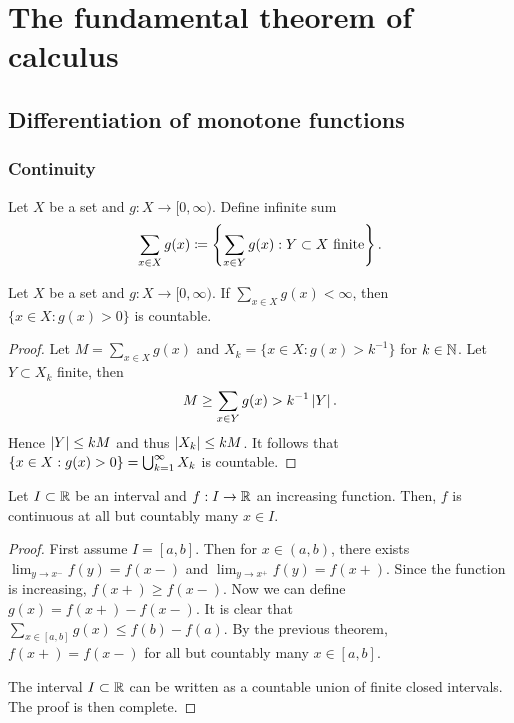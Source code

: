 \documentclass[a4paper]{article}
\author{Notes taken by \nauthor\vspace{5pt}\\ 
Lectures by Giovanni Leoni\vspace{5pt}\\
Carnegie Mellon University}
\begin{document}
\maketitle

\tableofcontents

\section{The fundamental theorem of calculus}

\subsection{Differentiation of monotone functions}

\subsubsection*{Continuity}

\begin{defi}
  Let $X$ be a set and $g : X \to [0, \infty)$. Define infinite sum
  \[
    \sum_{x \in X} g(x) \coloneq \left\{ \sum_{x \in Y} g(x) :
    Y \subset X \text{ finite} \right\}.
  \]
\end{defi}

\begin{thm}
  Let $X$ be a set and $g : X \to [0, \infty)$. If $\sum_{x \in X} g(x) <
    \infty$, then $\{ x \in X : g(x) > 0\}$ is countable.
\end{thm}

\begin{proof}
  Let $M = \sum_{x \in X} g(x)$ and $X_k = \{ x \in X : g(x) > k^{-1} \}$
  for $k \in \mathbb{N}$. Let $Y \subset X_k$ finite, then
  \[
    M \geq \sum_{x \in Y} g(x) > k^{-1} \left\lvert Y\right\rvert.
  \]
  Hence $\left\lvert Y\right\rvert \leq k M$ and thus $\left\lvert X_k\right\rvert \leq k M$. It follows that
  $\{ x \in X : g(x) > 0 \} = \bigcup_{k=1}^\infty X_k$ is countable.
\end{proof}

\begin{thm}
  Let $I \subset \mathbb{R}$ be an interval and $f : I \to \mathbb{R}$ an increasing
  function. Then, $f$ is continuous at all but countably many $x \in I$.
\end{thm}

\begin{proof}
  First assume $I = [a, b]$. Then for $x \in (a, b)$, there exists
  $\lim_{y \to x^-} f(y) = f(x-)$ and $\lim_{y \to x^+} f(y) = f(x+)$.
  Since the function is increasing, $f(x+) \geq f(x-)$. Now we can define
  $g (x) = f(x+) - f(x-)$. It is clear that $\sum_{x \in [a, b]} g(x) \leq
    f(b) - f(a)$. By the previous theorem, $f(x+) = f(x-)$ for all but
  countably many $x \in [a, b]$.

  The interval $I \subset \mathbb{R}$ can be written as a countable union of
  finite closed intervals. The proof is then complete.
\end{proof}
\end{document}
